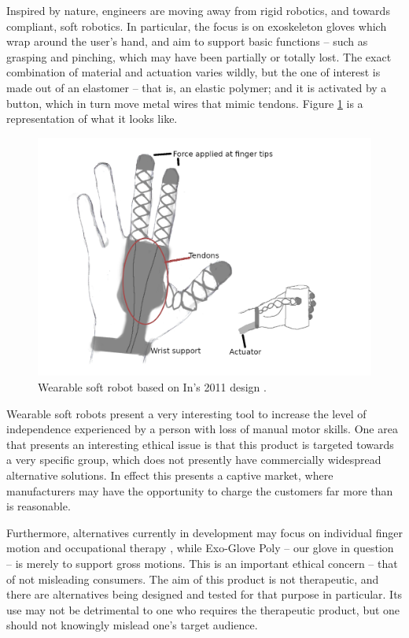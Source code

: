 Inspired by nature, engineers are moving away from rigid robotics, and towards compliant, soft robotics.
In particular, the focus is on exoskeleton gloves which wrap around the user's hand, and aim to support basic functions -- such as grasping and pinching, which may have been partially or totally lost.
The exact combination of material and actuation varies wildly, but the one of interest is made out of an elastomer -- that is, an elastic polymer; and it is activated by a button, which in turn move metal wires that mimic tendons.
Figure \ref{fig:Wearable_Glove} is a representation of what it looks like.

\begin{figure}[h]
    \centering
    \includegraphics[width=0.8\columnwidth]{files/Gloves.png}
    \caption{Wearable soft robot based on In's 2011 design \citep{InHyunki2011Jsau}. }
    \label{fig:Wearable_Glove}
\end{figure}

Wearable soft robots present a very interesting tool to increase the level of independence experienced by a person with loss of manual motor skills.
One area that presents an interesting ethical issue is that this product is targeted towards a very specific group, which does not presently have commercially widespread alternative solutions.
In effect this presents a captive market, where manufacturers may have the opportunity to charge the customers far more than is reasonable.

Furthermore, alternatives currently in development may focus on individual finger motion and occupational therapy \citep{CianchettiMatteo2018Baos,ConnellyLauri2010APGa}, while Exo-Glove Poly -- our glove in question -- is merely to support gross motions.
This is an important ethical concern -- that of not misleading consumers. The aim of this product is not therapeutic, and there are alternatives being designed and tested for that purpose in particular.
Its use may not be detrimental to one who requires the therapeutic product, but one should not knowingly mislead one's target audience.

